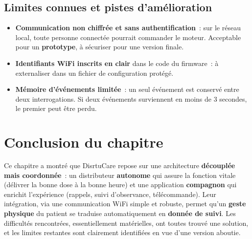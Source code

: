 \documentclass[11pt,a4paper]{report}
\begin{document}
\subsection{Limites connues et pistes d'am\'elioration}

\begin{warnbox}
\begin{itemize}
  \item \textbf{Communication non chiffr\'ee et sans authentification}~: sur le r\'eseau
        local, toute personne connect\'ee pourrait commander le moteur. Acceptable pour un
        \textbf{prototype}, \`a s\'ecuriser pour une version finale.
  \item \textbf{Identifiants WiFi inscrits en clair} dans le code du firmware~: \`a
        externaliser dans un fichier de configuration prot\'eg\'e.
  \item \textbf{M\'emoire d'\'ev\'enements limit\'ee}~: un seul \'ev\'enement est conserv\'e
        entre deux interrogations. Si deux \'ev\'enements surviennent en moins de 3 secondes,
        le premier peut \^etre perdu.
\end{itemize}
\end{warnbox}

\section*{Conclusion du chapitre}

Ce chapitre a montr\'e que DisrtuCare repose sur une architecture \textbf{d\'ecoupl\'ee mais
coordonn\'ee}~: un distributeur \textbf{autonome} qui assure la fonction vitale (d\'elivrer la
bonne dose \`a la bonne heure) et une application \textbf{compagnon} qui enrichit
l'exp\'erience (rappels, suivi d'observance, t\'el\'ecommande). Leur int\'egration, via une
communication WiFi simple et robuste, permet qu'un \textbf{geste physique} du patient se
traduise automatiquement en \textbf{donn\'ee de suivi}. Les difficult\'es rencontr\'ees,
essentiellement mat\'erielles, ont toutes trouv\'e une solution, et les limites restantes
sont clairement identifi\'ees en vue d'une version aboutie.
\end{document}

